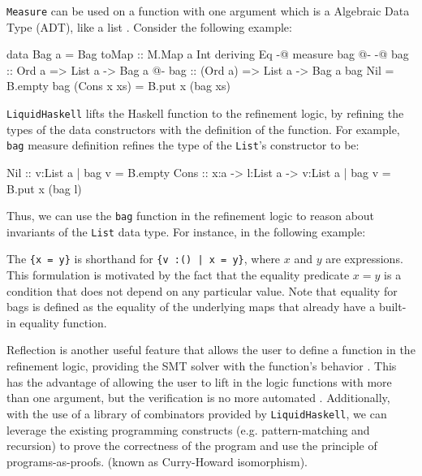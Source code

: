 \documentclass[]{rptuseminar}
\begin{document}
\texttt{Measure} can be used on a function with one argument which is a Algebraic Data Type (ADT), like a list \cite{niki_lecture_2024}. 
Consider the following example:

\begin{haskell}
data Bag a = Bag { toMap :: M.Map a Int } deriving Eq
{-@ measure bag @-}
{-@ bag :: Ord a => List a -> Bag a @-}
bag :: (Ord a) => List a -> Bag a
bag Nil = B.empty
bag (Cons x xs) = B.put x (bag xs)
\end{haskell}

\texttt{LiquidHaskell} lifts the Haskell function to the refinement logic, by refining the types of the data constructors with the
definition of the function\cite{niki_lecture_2024}. 
For example, \texttt{bag} measure definition refines the type of the \texttt{List}'s constructor to be:
\begin{haskell}
Nil  :: {v:List a | bag v = B.empty}
Cons :: x:a -> l:List a -> {v:List a | bag v = B.put x (bag l)}
\end{haskell}

Thus, we can use the \texttt{bag} function in the refinement logic to reason about 
invariants of the \texttt{List} data type. For instance, in the following example:

The \texttt{\{x = y\}} is shorthand for \texttt{\{v :() | x = y\}}, where $x$ and $y$ are expressions.
This formulation is motivated by the fact that the equality predicate $x = y$ is a condition that does not depend on any particular value.
Note that equality for bags is defined as the equality of the underlying maps that already have a built-in equality function.


Reflection is another useful feature that allows the user to define a function in the refinement logic, providing
the SMT solver with the function's behavior \cite{vazou_refinement_2018}. 
This has the advantage of allowing the user to lift in the logic functions with more than one argument, but the verification
is no more automated \cite{niki_lecture_2024}.
Additionally, with the use of a library of combinators provided by \texttt{LiquidHaskell}, we can leverage 
the existing programming constructs (e.g. pattern-matching and recursion) to prove the correctness of the 
program and use the principle of programs-as-proofs. 
(known as Curry-Howard isomorphism)\cite{vazou_refinement_2018, wadler_propositions_2015}.
\end{document}
